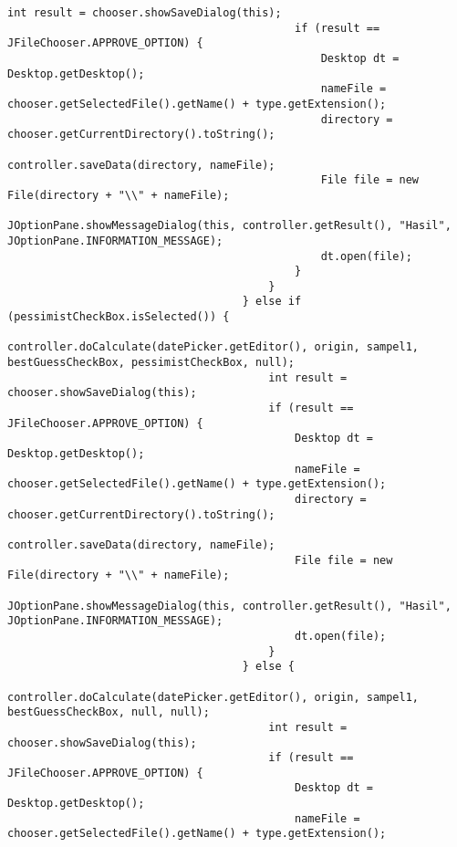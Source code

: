\begin{lstlisting}[caption= main.java]
                                            int result = chooser.showSaveDialog(this);
                                            if (result == JFileChooser.APPROVE_OPTION) {
                                                Desktop dt = Desktop.getDesktop();
                                                nameFile = chooser.getSelectedFile().getName() + type.getExtension();
                                                directory = chooser.getCurrentDirectory().toString();
                                                controller.saveData(directory, nameFile);
                                                File file = new File(directory + "\\" + nameFile);
                                                JOptionPane.showMessageDialog(this, controller.getResult(), "Hasil", JOptionPane.INFORMATION_MESSAGE);
                                                dt.open(file);
                                            }
                                        }
                                    } else if (pessimistCheckBox.isSelected()) {
                                        controller.doCalculate(datePicker.getEditor(), origin, sampel1, bestGuessCheckBox, pessimistCheckBox, null);
                                        int result = chooser.showSaveDialog(this);
                                        if (result == JFileChooser.APPROVE_OPTION) {
                                            Desktop dt = Desktop.getDesktop();
                                            nameFile = chooser.getSelectedFile().getName() + type.getExtension();
                                            directory = chooser.getCurrentDirectory().toString();
                                            controller.saveData(directory, nameFile);
                                            File file = new File(directory + "\\" + nameFile);
                                            JOptionPane.showMessageDialog(this, controller.getResult(), "Hasil", JOptionPane.INFORMATION_MESSAGE);
                                            dt.open(file);
                                        }
                                    } else {
                                        controller.doCalculate(datePicker.getEditor(), origin, sampel1, bestGuessCheckBox, null, null);
                                        int result = chooser.showSaveDialog(this);
                                        if (result == JFileChooser.APPROVE_OPTION) {
                                            Desktop dt = Desktop.getDesktop();
                                            nameFile = chooser.getSelectedFile().getName() + type.getExtension();

\end{lstlisting}
